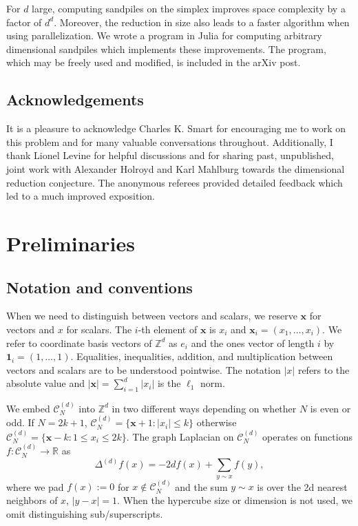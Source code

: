 \documentclass[12pt]{amsart}
\newcommand{\Z}{\mathbb{Z}}
\begin{document}
	For $d$ large, computing sandpiles on the simplex improves space complexity by a factor of $d^d$. Moreover, the reduction in size also leads to a faster algorithm when using parallelization. We wrote a program in Julia \cite{bezanson2017julia, besard2018effective} for computing arbitrary dimensional sandpiles which implements these improvements. The program, which may be freely used and modified, is included in the arXiv post. 
	
	
	\subsection*{Acknowledgements}	
	It is a pleasure to acknowledge Charles K. Smart for encouraging me to work on this problem and for many valuable conversations throughout.
	Additionally, I thank Lionel Levine for helpful discussions and for sharing past, unpublished, joint work with Alexander Holroyd and Karl Mahlburg towards the dimensional reduction conjecture. The anonymous referees provided detailed feedback which led to a much improved exposition.
	
	
	\section{Preliminaries} \label{sec:prelims}
	
	
	\subsection{Notation and conventions} \label{subsec:notation}
	When we need to distinguish between vectors and scalars, we reserve $\mathbf{x}$
	for vectors and $x$ for scalars. The $i$-th element of $\mathbf{x}$ is $x_i$
	and $\mathbf{x}_{i} = (x_1, \ldots, x_i)$. We refer to coordinate basis vectors of 
	$\Z^d$ as $e_i$ and the ones vector of length $i$ by
	$\mathbf{1}_{i} = (1, \ldots, 1)$. Equalities, inequalities, addition, and multiplication between vectors and scalars are to be understood pointwise. 
	The notation $|x|$ refers to the absolute value and $|\mathbf{x}| = \sum_{i=1}^d |x_i|$ is the $\ell_1$ norm. 
	
	
	We embed $\mathcal{C}_{N}^{(d)}$ into $\Z^d$ in two different ways depending on whether $N$ is even or odd. If $N = 2 k + 1$,  $\mathcal{C}_N^{(d)} = \{ \mathbf{x} +1 : |x_i| \leq k \}$  otherwise $\mathcal{C}_N^{(d)} = \{ \mathbf{x}-k : 1 \leq x_i \leq 2 k \}$.
	The graph Laplacian on $\mathcal{C}_N^{(d)}$ operates on functions
	$f: \mathcal{C}_N^{(d)} \to \mathbb{R}$ as 
	\begin{equation}
	\Delta^{(d)} f(x) = -2 d f(x) + \sum_{y \sim x} f(y), 
	\end{equation}
	where we pad $f(x) := 0$ for $x \not \in \mathcal{C}_N^{(d)}$ and the 
	sum $y \sim x$ is over the 2d nearest neighbors of $x$, $|y-x| = 1$.  When the hypercube size or dimension is not used, we omit distinguishing sub/superscripts. 
	
\end{document}
